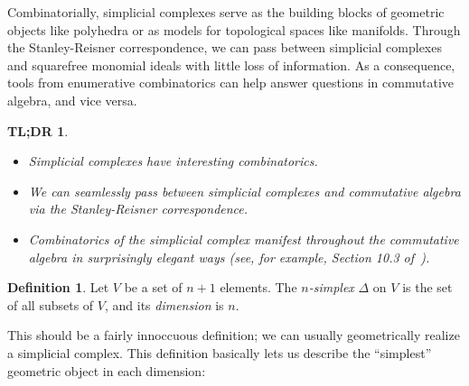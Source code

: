 \documentclass[12pt,a4paper]{article}
\newtheorem*{tldr}{TL;DR}
\theoremstyle{definition}
\newtheorem{definition}[theorem]{Definition}
\numberwithin{equation}{section}
\begin{document}
\vspace*{2.5cm}

Combinatorially, simplicial complexes serve as the building blocks of geometric objects like polyhedra or as models for topological spaces like manifolds.
Through the Stanley-Reisner correspondence, we can pass between simplicial complexes and squarefree monomial ideals with little loss of information.
As a consequence, tools from enumerative combinatorics can help answer questions in commutative algebra, and vice versa.

\vspace*{2.5cm}

\begin{tldr}
    \phantom{ }
    \begin{itemize}
        \item Simplicial complexes have interesting combinatorics.
        
        \item We can seamlessly pass between simplicial complexes and commutative algebra via the Stanley-Reisner correspondence.

        \item Combinatorics of the simplicial complex manifest throughout the commutative algebra in surprisingly elegant ways (see, for example, Section 10.3 of~\cite{schenck_computational_2003}).
    \end{itemize}
\end{tldr}

\vspace*{2.5cm}


\newpage
\begin{definition}
    Let $V$ be a set of $n+1$ elements.
    The \emph{$n$-simplex} $\Delta$ on $V$ is the set of all subsets of $V$, and its \emph{dimension} is $n$.
\end{definition}

This should be a fairly innoccuous definition; we can usually geometrically realize a simplicial complex.
This definition basically lets us describe the ``simplest'' geometric object in each dimension:
\end{document}
